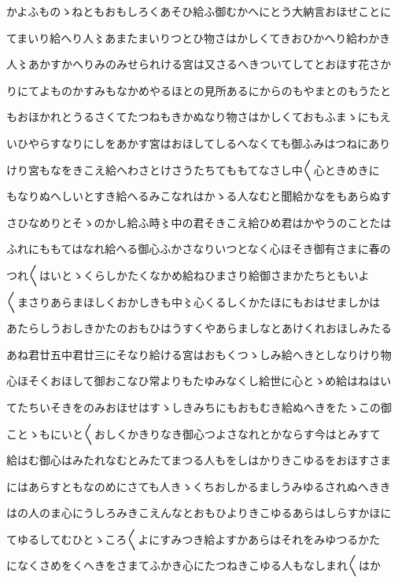 \documentclass[a4paper,11pt,landscape]{ltjtarticle}
\begin{document}
かよふものゝねともおもしろくあそひ給ふ御むかへにとう大納言おほせことに
\par\medskip
てまいり給へり人〻あまたまいりつとひ物さはかしくてきおひかへり給わかき
\par\medskip
人〻あかすかへりみのみせられける宮は又さるへきついてしてとおほす花さか
\par\medskip
りにてよものかすみもなかめやるほとの見所あるにからのもやまとのもうたと
\par\medskip
もおほかれとうるさくてたつねもきかぬなり物さはかしくておもふまゝにもえ
\par\medskip
いひやらすなりにしをあかす宮はおほしてしるへなくても御ふみはつねにあり
\par\medskip
けり宮もなをきこえ給へわさとけさうたちてももてなさし中〱心ときめきに
\par\medskip
もなりぬへしいとすき給へるみこなれはかゝる人なむと聞給かなをもあらぬす
\par\medskip
さひなめりとそゝのかし給ふ時〻中の君そきこえ給ひめ君はかやうのことたは
\par\medskip
ふれにももてはなれ給へる御心ふかさなりいつとなく心ほそき御有さまに春の
\par\medskip
つれ〱はいとゝくらしかたくなかめ給ねひまさり給御さまかたちともいよ
\par\medskip
〱まさりあらまほしくおかしきも中〻心くるしくかたほにもおはせましかは
\par\medskip
あたらしうおしきかたのおもひはうすくやあらましなとあけくれおほしみたる
\par\medskip
あね君廿五中君廿三にそなり給ける宮はおもくつゝしみ給へきとしなりけり物
\par\medskip
心ほそくおほして御おこなひ常よりもたゆみなくし給世に心とゝめ給はねはい
\par\medskip
てたちいそきをのみおほせはすゝしきみちにもおもむき給ぬへきをたゝこの御
\par\medskip
ことゝもにいと〱おしくかきりなき御心つよさなれとかならす今はとみすて
\par\medskip
給はむ御心はみたれなむとみたてまつる人もをしはかりきこゆるをおほすさま
\par\medskip
にはあらすともなのめにさても人きゝくちおしかるましうみゆるされぬへきき
\par\medskip
はの人のま心にうしろみきこえんなとおもひよりきこゆるあらはしらすかほに
\par\medskip
てゆるしてむひとゝころ〱よにすみつき給よすかあらはそれをみゆつるかた
\par\medskip
になくさめをくへきをさまてふかき心にたつねきこゆる人もなしまれ〱はか
\end{document}
